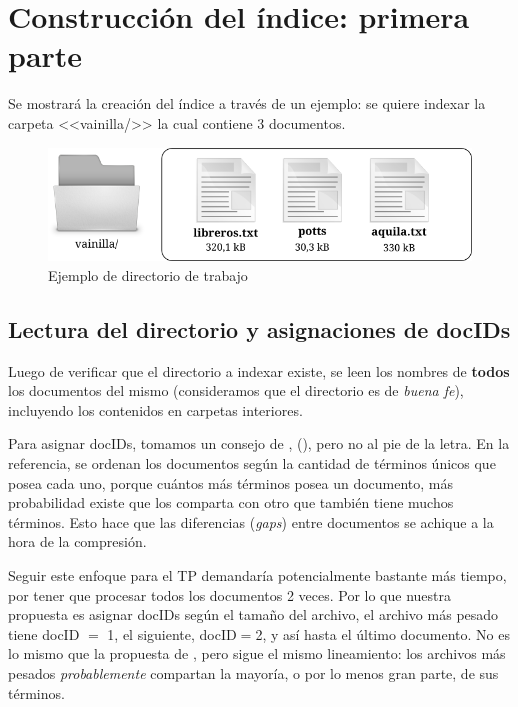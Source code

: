 \section{Construcción del índice: primera parte}

Se mostrará la creación del índice a través de un ejemplo: se quiere indexar la carpeta <<vainilla/>> la cual contiene 3 documentos.

\begin{figure}[!h]
\centering
    \includegraphics[scale=0.9]{./Images/vainillaDir.png}
\caption{Ejemplo de directorio de trabajo}
\label{fig:directorioTrabajo}
\end{figure}


\subsection{Lectura del directorio y asignaciones de docIDs}

Luego de verificar que el directorio a indexar existe, se leen los nombres de \textbf{todos} los documentos del mismo (consideramos que el directorio es de \textit{buena fe}), incluyendo los contenidos en carpetas interiores. 

Para asignar docIDs, tomamos un consejo de \citet[p.~216]{Buettcher2010}, (\citeyear{Buettcher2010}), pero no al pie de la letra. En la referencia, se ordenan los documentos según la cantidad de términos únicos que posea cada uno, porque cuántos más términos posea un documento, más probabilidad existe que los comparta con otro que también tiene muchos términos. Esto hace que las diferencias (\textit{gaps}) entre documentos se achique a la hora de la compresión.

Seguir este enfoque para el TP demandaría potencialmente bastante más tiempo, por tener que procesar todos los documentos 2 veces. Por lo que nuestra propuesta es asignar docIDs según el tamaño del archivo, el archivo más pesado tiene docID $=$ 1, el siguiente, docID$=$2, y así hasta el último documento. No es lo mismo que la propuesta de \cite{Buettcher2010}, pero sigue el mismo lineamiento: los archivos más pesados \textit{probablemente} compartan la mayoría, o por lo menos gran parte, de sus términos.

